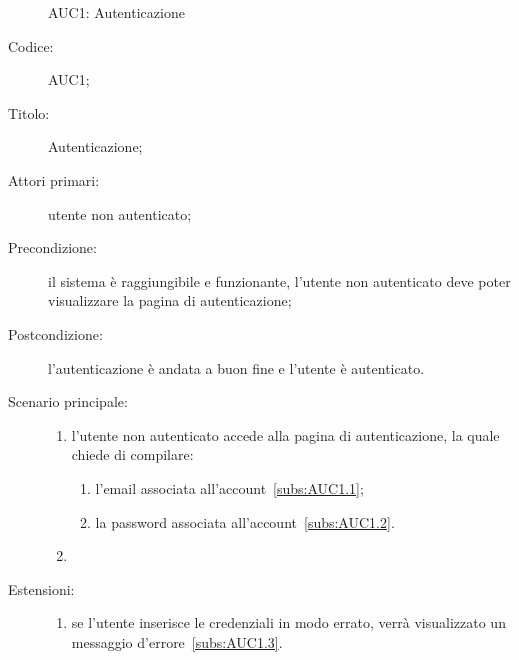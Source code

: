 \documentclass[../../../analisi-dei-requisiti.tex]{subfiles}
\begin{document}
\begin{figure}[H]
  \centering
  \caption{AUC1: Autenticazione}%
  \label{fig:auc1}
\end{figure}

\begin{description}
  \item[Codice:] AUC1;
  \item[Titolo:] Autenticazione;
  \item[Attori primari:] utente non autenticato;
  \item[Precondizione:] il sistema è raggiungibile e funzionante, l'utente non autenticato deve poter visualizzare la pagina di autenticazione;
  \item[Postcondizione:] l'autenticazione è andata a buon fine e l'utente è autenticato.
  \item[Scenario principale:]
  \begin{enumerate}
    \item l'utente non autenticato accede alla pagina di autenticazione, la quale chiede di compilare:
    \begin{enumerate}
      \item l’email associata all’account~\ref{subs:AUC1.1};
      \item la password associata all’account~\ref{subs:AUC1.2}.
    \end{enumerate}
    \item
  \end{enumerate}
  \item[Estensioni:]
  \begin{enumerate}
    \item se l'utente inserisce le credenziali in modo errato, verrà visualizzato un messaggio d'errore~\ref{subs:AUC1.3}.
  \end{enumerate}
\end{description}
\end{document}
